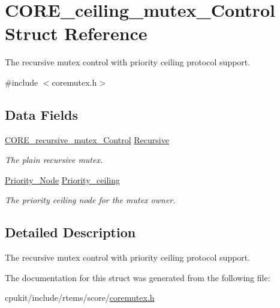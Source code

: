 \hypertarget{structCORE__ceiling__mutex__Control}{}\section{C\+O\+R\+E\+\_\+ceiling\+\_\+mutex\+\_\+\+Control Struct Reference}
\label{structCORE__ceiling__mutex__Control}


The recursive mutex control with priority ceiling protocol support.  




{\ttfamily \#include $<$coremutex.\+h$>$}

\subsection*{Data Fields}
\begin{DoxyCompactItemize}
\item 
\mbox{\label{structCORE__ceiling__mutex__Control_a9aa917a17b3cc8ee12068cfb1b717f47}} 
\mbox{\hyperlink{structCORE__recursive__mutex__Control}{C\+O\+R\+E\+\_\+recursive\+\_\+mutex\+\_\+\+Control}} \mbox{\hyperlink{structCORE__ceiling__mutex__Control_a9aa917a17b3cc8ee12068cfb1b717f47}{Recursive}}
\begin{DoxyCompactList}\small\item\em The plain recursive mutex. \end{DoxyCompactList}\item 
\mbox{\label{structCORE__ceiling__mutex__Control_a5d407153d04add173eb3f1f12c1dbf9f}} 
\mbox{\hyperlink{structPriority__Node}{Priority\+\_\+\+Node}} \mbox{\hyperlink{structCORE__ceiling__mutex__Control_a5d407153d04add173eb3f1f12c1dbf9f}{Priority\+\_\+ceiling}}
\begin{DoxyCompactList}\small\item\em The priority ceiling node for the mutex owner. \end{DoxyCompactList}\end{DoxyCompactItemize}


\subsection{Detailed Description}
The recursive mutex control with priority ceiling protocol support. 

The documentation for this struct was generated from the following file\+:\begin{DoxyCompactItemize}
\item 
cpukit/include/rtems/score/\mbox{\hyperlink{coremutex_8h}{coremutex.\+h}}\end{DoxyCompactItemize}

